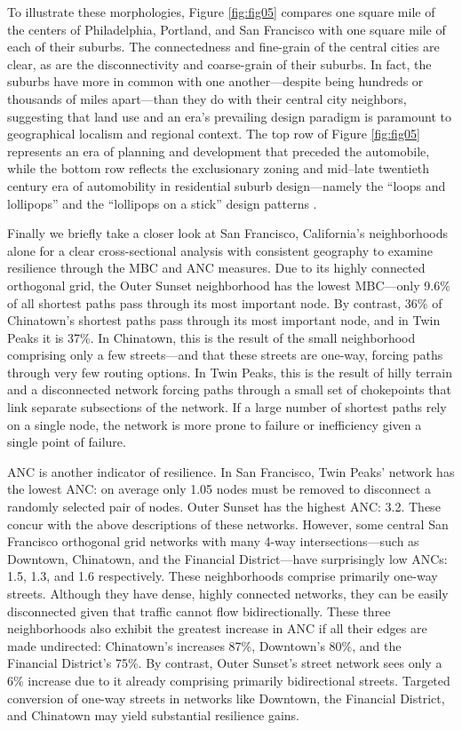 \documentclass[11pt]{article}
\begin{document}
\begin{multicols}{2}
To illustrate these morphologies, Figure \ref{fig:fig05} compares one square mile of the centers of Philadelphia, Portland, and San Francisco with one square mile of each of their suburbs. The connectedness and fine-grain of the central cities are clear, as are the disconnectivity and coarse-grain of their suburbs. In fact, the suburbs have more in common with one another---despite being hundreds or thousands of miles apart---than they do with their central city neighbors, suggesting that land use and an era's prevailing design paradigm is paramount to geographical localism and regional context. The top row of Figure \ref{fig:fig05} represents an era of planning and development that preceded the automobile, while the bottom row reflects the exclusionary zoning and mid--late twentieth century era of automobility in residential suburb design---namely the \enquote{loops and lollipops} and the \enquote{lollipops on a stick} design patterns \citep{southworth_streets_1997}.

Finally we briefly take a closer look at San Francisco, California's neighborhoods alone for a clear cross-sectional analysis with consistent geography to examine resilience through the MBC and ANC measures. Due to its highly connected orthogonal grid, the Outer Sunset neighborhood has the lowest MBC---only 9.6\% of all shortest paths pass through its most important node. By contrast, 36\% of Chinatown's shortest paths pass through its most important node, and in Twin Peaks it is 37\%. In Chinatown, this is the result of the small neighborhood comprising only a few streets---and that these streets are one-way, forcing paths through very few routing options. In Twin Peaks, this is the result of hilly terrain and a disconnected network forcing paths through a small set of chokepoints that link separate subsections of the network. If a large number of shortest paths rely on a single node, the network is more prone to failure or inefficiency given a single point of failure.

ANC is another indicator of resilience. In San Francisco, Twin Peaks' network has the lowest ANC: on average only 1.05 nodes must be removed to disconnect a randomly selected pair of nodes. Outer Sunset has the highest ANC: 3.2. These concur with the above descriptions of these networks. However, some central San Francisco orthogonal grid networks with many 4-way intersections---such as Downtown, Chinatown, and the Financial District---have surprisingly low ANCs: 1.5, 1.3, and 1.6 respectively. These neighborhoods comprise primarily one-way streets. Although they have dense, highly connected networks, they can be easily disconnected given that traffic cannot flow bidirectionally. These three neighborhoods also exhibit the greatest increase in ANC if all their edges are made undirected: Chinatown's increases 87\%, Downtown's 80\%, and the Financial District's 75\%. By contrast, Outer Sunset's street network sees only a 6\% increase due to it already comprising primarily bidirectional streets. Targeted conversion of one-way streets in networks like Downtown, the Financial District, and Chinatown may yield substantial resilience gains.




\end{multicols}
\end{document}
